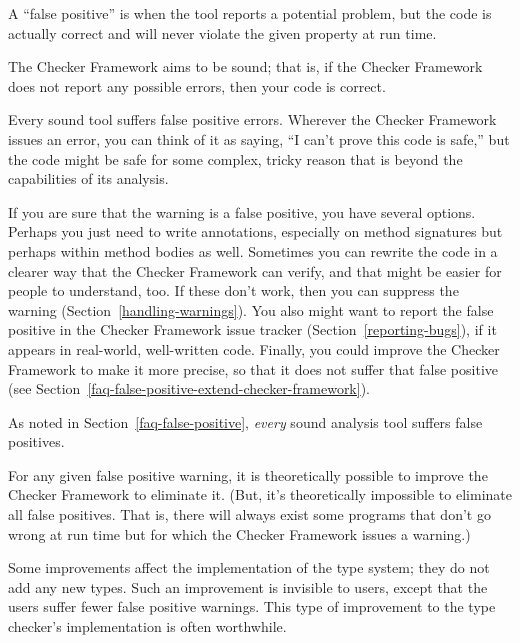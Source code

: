 


A ``false positive'' is when the tool reports a potential problem, but the
code is actually correct and will never violate the given property at run
time.

The Checker Framework aims to be sound; that is, if the Checker Framework
does not report any possible errors, then your code is correct.

Every sound tool suffers false positive errors.
Wherever the Checker Framework issues an error, you can think of it as
saying, ``I can't prove this code is safe,'' but the code might be safe for
some complex, tricky reason that is beyond the capabilities of its
analysis.

If you are sure that the warning is a false positive, you have several
options.
Perhaps you just need to write annotations, especially on method signatures
but perhaps within method bodies as well.
Sometimes you can rewrite the code in a clearer way that the Checker
Framework can verify, and that might be easier for people to understand, too.
If these don't work, then you can suppress the warning
(Section~\ref{handling-warnings}).
You also might want to report
the false positive in the Checker Framework issue tracker
(Section~\ref{reporting-bugs}), if it appears in real-world, well-written code.
%
Finally, you could improve the Checker Framework to make it more
precise, so that it does not suffer that false positive (see
Section~\ref{faq-false-positive-extend-checker-framework}).



As noted in Section~\ref{faq-false-positive}, \emph{every} sound analysis
tool suffers false positives.

For any given false positive warning, it is theoretically possible to
improve the Checker Framework to eliminate it.  (But, it's theoretically
impossible to eliminate all false positives.  That is, there
will always exist some programs that don't go wrong at run time but for
which the Checker Framework issues a warning.)

Some improvements affect the implementation of the type system; they do not
add any new types.  Such an improvement is invisible to users, except that
the users suffer fewer false positive warnings.  This type of improvement
to the type checker's implementation is often worthwhile.

